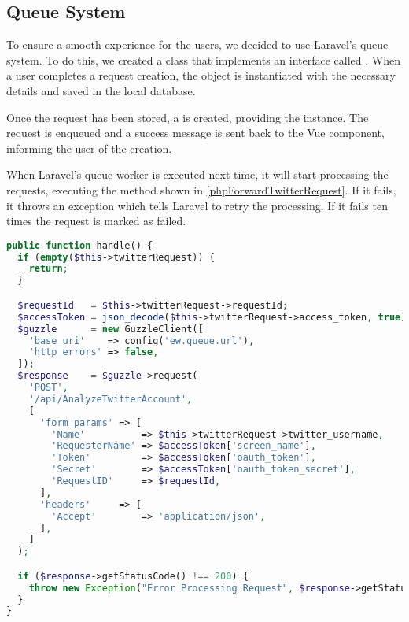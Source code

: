 \subsection{Queue System} \label{sub:gui-queue}
To ensure a smooth experience for the users, we decided to use Laravel's
queue system. To do this, we created a  class that
implements an interface called . When a user completes a
request creation, the  object is instantiated with the
necessary details and saved in the local database.\nl

Once the request has been stored, a  is
created, providing the  instance. The request is enqueued and a
success message is sent back to the Vue component, informing the user of the
creation.\nl

When Laravel's queue worker is executed next time, it will start processing the
requests, executing the  method shown in
\autoref{phpForwardTwitterRequest}. If it fails, it throws an exception
which tells Laravel to retry the processing. If it fails ten times the request is
marked as failed.\nl

\begin{minipage}[H]{\linewidth}
\begin{lstlisting}[caption = Handle method of the \textc{ForwardTwitterRequest}
class., label = phpForwardTwitterRequest, language = PHP, style = PHP]
public function handle() {
  if (empty($this->twitterRequest)) {
    return;
  }

  $requestId   = $this->twitterRequest->requestId;
  $accessToken = json_decode($this->twitterRequest->access_token, true);
  $guzzle      = new GuzzleClient([
    'base_uri'    => config('ew.queue.url'),
    'http_errors' => false,
  ]);
  $response    = $guzzle->request(
    'POST',
    '/api/AnalyzeTwitterAccount',
    [
      'form_params' => [
        'Name'          => $this->twitterRequest->twitter_username,
        'RequesterName' => $accessToken['screen_name'],
        'Token'         => $accessToken['oauth_token'],
        'Secret'        => $accessToken['oauth_token_secret'],
        'RequestID'     => $requestId,
      ],
      'headers'     => [
        'Accept'        => 'application/json',
      ],
    ]
  );

  if ($response->getStatusCode() !== 200) {
    throw new Exception("Error Processing Request", $response->getStatusCode());
  }
}
\end{lstlisting}
\end{minipage}

